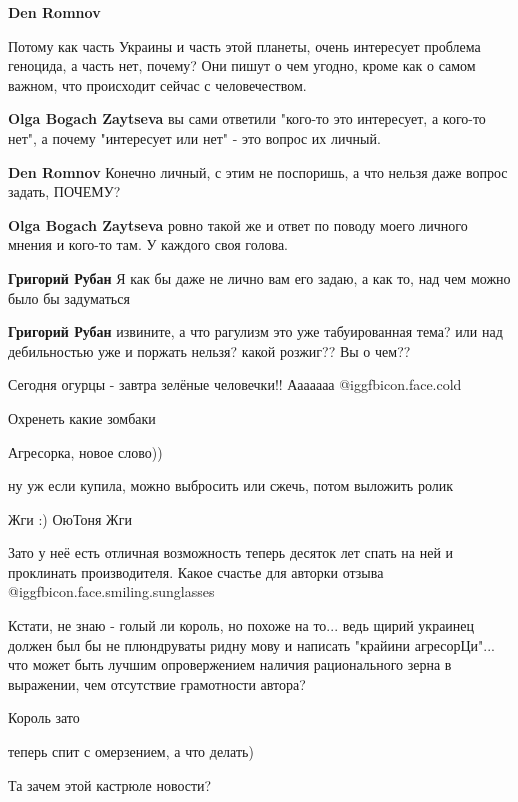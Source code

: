 \begin{multicols}{2}
\begin{itemize}
\textbf{Den Romnov} 

Потому как часть Украины и часть этой планеты, очень интересует проблема
геноцида, а часть нет, почему? Они пишут о чем угодно, кроме как о самом
важном, что происходит сейчас с человечеством.

\textbf{Olga Bogach Zaytseva} вы сами ответили "кого-то это интересует, а кого-то нет", а почему "интересует или нет" - это вопрос их личный.

\textbf{Den Romnov} Конечно личный, с этим не поспоришь, а что нельзя даже вопрос задать, ПОЧЕМУ?

\textbf{Olga Bogach Zaytseva} ровно такой же и ответ по поводу моего личного мнения и кого-то там. У каждого своя голова.

\textbf{Григорий Рубан} Я как бы даже не лично вам его задаю, а как то, над чем можно было бы задуматься

\textbf{Григорий Рубан} извините, а что рагулизм это уже табуированная тема?
или над дебильностью уже и поржать нельзя?
какой розжиг?? Вы о чем??

\end{itemize} %

Сегодня огурцы - завтра зелёные человечки!! Ааааааа  @igg{fbicon.face.cold} 

Охренеть какие зомбаки

Агресорка, новое слово))

ну уж если купила, можно выбросить или сжечь, потом выложить ролик

Жги :) ОюТоня Жги

Зато у неё есть отличная возможность теперь десяток лет спать на ней и проклинать производителя. Какое счастье для авторки отзыва  @igg{fbicon.face.smiling.sunglasses} 


Кстати, не знаю - голый ли король, но похоже на то... ведь щирий украинец
должен был бы не плюндруваты ридну мову и написать "крайини агресорЦи"... что
может быть лучшим опровержением наличия рационального зерна в выражении, чем
отсутствие грамотности автора?

Король зато

теперь спит с омерзением, а что делать)

Та зачем этой кастрюле новости?

\end{multicols}
